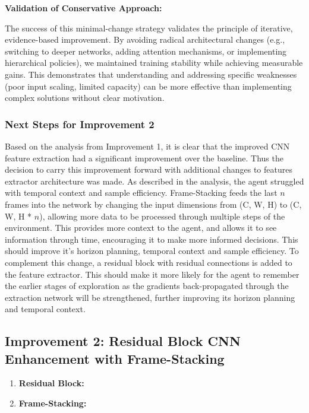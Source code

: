 \documentclass[twocolumn]{article}
\begin{document}
\textbf{Validation of Conservative Approach:}

The success of this minimal-change strategy validates the principle of iterative, evidence-based improvement. By avoiding radical architectural changes (e.g., switching to deeper networks, adding attention mechanisms, or implementing hierarchical policies), we maintained training stability while achieving measurable gains. This demonstrates that understanding and addressing specific weaknesses (poor input scaling, limited capacity) can be more effective than implementing complex solutions without clear motivation.

\subsubsection*{Next Steps for Improvement 2}

Based on the analysis from Improvement 1, it is clear that the improved CNN feature extraction had a significant improvement over the baseline. Thus the decision to carry this improvement forward with additional changes to features extractor architecture was made. As described in the analysis, the agent struggled with temporal context and sample efficiency. Frame-Stacking feeds the last $n$ frames into the network by changing the input dimensions from (C, W, H) to (C, W, H * $n$), allowing more data to be processed through multiple steps of the environment. This provides more context to the agent, and allows it to see information through time, encouraging it to make more informed decisions. This should improve it's horizon planning, temporal context and sample efficiency. To complement this change, a residual block with residual connections is added to the feature extractor. This should make it more likely for the agent to remember the earlier stages of exploration as the gradients back-propagated through the extraction network will be strengthened, further improving its horizon planning and temporal context. 

\subsection*{Improvement 2: Residual Block CNN Enhancement with Frame-Stacking}
\begin{enumerate}
	\item \textbf{Residual Block:} 
	
	\item \textbf{Frame-Stacking:} 
\end{enumerate}
\end{document}
